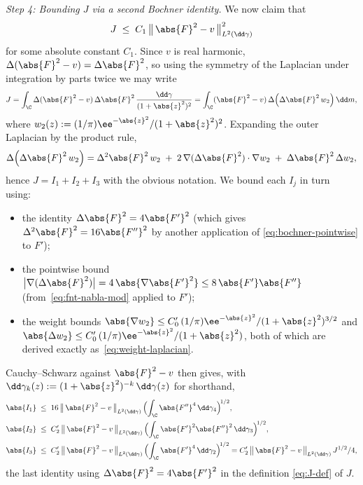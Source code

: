 \medskip
\noindent\emph{Step 4: Bounding $J$ via a second Bochner identity.}\;
We now claim that
\begin{equation}\label{eq:J-bound}
J \;\le\; C_1\, \bigl\|\,\abs{F}^2 - v\,\bigr\|_{L^2(\dd\gamma)}^2
\end{equation}
for some absolute constant $C_1$. Since $v$ is real harmonic,
$\Delta(\abs{F}^2 - v) = \Delta\abs{F}^2$, so using the symmetry of the
Laplacian under integration by parts twice we may write
\[
J
= \int_{\C} \Delta(\abs{F}^2 - v)\, \Delta\abs{F}^2\,
\frac{\dd\gamma}{(1+\abs{z}^2)^2}
= \int_{\C} (\abs{F}^2 - v)\,
\Delta\!\left(\Delta\abs{F}^2\, w_2\right) \dd m,
\]
where $w_2(z) := (1/\pi)\ee^{-\abs{z}^2}/(1+\abs{z}^2)^2$. Expanding the
outer Laplacian by the product rule,
\[
\Delta\!\left(\Delta\abs{F}^2\, w_2\right)
= \Delta^2\abs{F}^2\, w_2
\;+\; 2\, \nabla(\Delta\abs{F}^2) \cdot \nabla w_2
\;+\; \Delta\abs{F}^2\, \Delta w_2,
\]
hence $J = I_1 + I_2 + I_3$ with the obvious notation. We bound each
$I_j$ in turn using:
\begin{itemize}[leftmargin=2em]
    \item the identity $\Delta\abs{F}^2 = 4\abs{F'}^2$ (which gives
    $\Delta^2\abs{F}^2 = 16\abs{F''}^2$ by another application of
    \eqref{eq:bochner-pointwise} to $F'$);
    \item the pointwise bound $\bigl|\nabla(\Delta\abs{F}^2)\bigr|
    = 4\,\abs{\nabla\abs{F'}^2} \le 8\,\abs{F'}\abs{F''}$
    (from~\eqref{eq:fnt-nabla-mod} applied to $F'$);
    \item the weight bounds $\abs{\nabla w_2} \le C_0'\,
    (1/\pi)\ee^{-\abs{z}^2}/(1+\abs{z}^2)^{3/2}$ and
    $\abs{\Delta w_2} \le C_0'\,
    (1/\pi)\ee^{-\abs{z}^2}/(1+\abs{z}^2)$, both of which are derived
    exactly as~\eqref{eq:weight-laplacian}.
\end{itemize}
Cauchy--Schwarz against $\abs{F}^2 - v$ then gives, with $\dd\gamma_k(z)
:= (1+\abs{z}^2)^{-k}\,\dd\gamma(z)$ for shorthand,
\begin{align*}
\abs{I_1}
&\;\le\; 16\,\bigl\|\,\abs{F}^2-v\,\bigr\|_{L^2(\dd\gamma)}\,
\Bigl(\int_{\C}\abs{F''}^4\,\dd\gamma_4\Bigr)^{\!1/2}, \\
\abs{I_2}
&\;\le\; C_2'\,\bigl\|\,\abs{F}^2-v\,\bigr\|_{L^2(\dd\gamma)}\,
\Bigl(\int_{\C}\abs{F'}^2\abs{F''}^2\,\dd\gamma_3\Bigr)^{\!1/2}, \\
\abs{I_3}
&\;\le\; C_2'\,\bigl\|\,\abs{F}^2-v\,\bigr\|_{L^2(\dd\gamma)}\,
\Bigl(\int_{\C}\abs{F'}^4\,\dd\gamma_2\Bigr)^{\!1/2}
= C_2'\,\bigl\|\,\abs{F}^2-v\,\bigr\|_{L^2(\dd\gamma)}\, J^{1/2}/4,
\end{align*}
the last identity using $\Delta\abs{F}^2 = 4\abs{F'}^2$ in the definition
\eqref{eq:J-def} of $J$.

